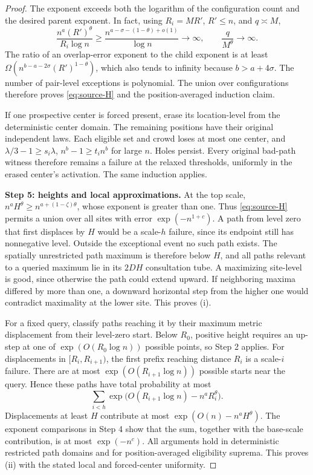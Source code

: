 \begin{proof}
The exponent exceeds both the logarithm of the configuration count and
the desired parent exponent. In fact, using \(R_i=MR'\), \(R'\le n\),
and \(q\asymp M\),
\[
 \frac{n^a(R')^\theta}{R_i\log n}
 \ge\frac{n^{a-\sigma-(1-\theta)+o(1)}}{\log n}\longrightarrow\infty,
 \qquad \frac{q}{M^\theta}\longrightarrow\infty.
\]
The ratio of an overlap-error exponent to the child exponent is at least
\(\Omega(n^{b-a-2\sigma}(R')^{1-\theta})\), which also tends to infinity
because \(b>a+4\sigma\). The number of pair-level exceptions is
polynomial. The union over configurations therefore proves
\eqref{eq:source-H} and the position-averaged induction claim.

If one prospective center is forced present, erase its location-level
from the deterministic center domain. The remaining positions have their
original independent laws. Each eligible set and crowd loses at most one
center, and
\(\lambda/3-1\ge s_i\lambda\), \(n^b-1\ge t_i n^b\) for large \(n\).
Holes persist. Every original bad-path witness therefore remains a
failure at the relaxed thresholds, uniformly in the erased center's
activation. The same induction applies.

\noindent\textbf{Step 5: heights and local approximations.}\quad
At the top scale,
\(n^aH^\theta\ge n^{a+(1-\zeta)\theta}\), whose exponent is greater
than one. Thus \eqref{eq:source-H} permits a union over all sites with
error \(\exp(-n^{1+c})\). A path from level zero that first displaces by
\(H\) would be a scale-\(h\) failure, since its endpoint still has
nonnegative level. Outside the exceptional event no such path exists.
The spatially unrestricted path maximum is therefore below \(H\), and
all paths relevant to a queried maximum lie in its \(2DH\) consultation
tube. A maximizing site-level is good, since otherwise the path could
extend upward. If neighboring maxima differed by more than one, a
downward horizontal step from the higher one would contradict maximality
at the lower site. This proves (i).

For a fixed query, classify paths reaching it by their maximum metric
displacement from their level-zero start. Below \(R_0\), positive height
requires an up-step at one of \(\exp(O(R_0\log n))\) possible points,
so Step 2 applies. For displacements in \([R_i,R_{i+1})\), the first
prefix reaching distance \(R_i\) is a scale-\(i\) failure. There are at
most \(\exp(O(R_{i+1}\log n))\) possible starts near the query. Hence
these paths have total probability at most
\[
 \sum_{i<h}\exp\bigl(O(R_{i+1}\log n)-n^aR_i^\theta\bigr).
\]
Displacements at least \(H\) contribute at most
\(\exp(O(n)-n^aH^\theta)\). The exponent comparisons in Step 4 show
that the sum, together with the base-scale contribution, is at most
\(\exp(-n^c)\). All arguments hold in deterministic restricted path
domains and for position-averaged eligibility suprema. This proves (ii)
with the stated local and forced-center uniformity.


\end{proof}
